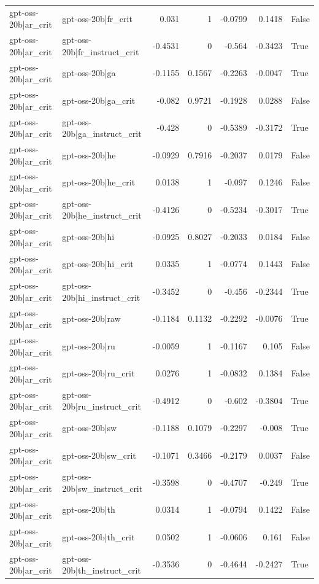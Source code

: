 \begin{table}
\begin{tabular}{l l r r r r l}
gpt-oss-20b|ar_crit & gpt-oss-20b|fr_crit & 0.031 & 1 & -0.0799 & 0.1418 & False \\
gpt-oss-20b|ar_crit & gpt-oss-20b|fr_instruct_crit & -0.4531 & 0 & -0.564 & -0.3423 & True \\
gpt-oss-20b|ar_crit & gpt-oss-20b|ga & -0.1155 & 0.1567 & -0.2263 & -0.0047 & True \\
gpt-oss-20b|ar_crit & gpt-oss-20b|ga_crit & -0.082 & 0.9721 & -0.1928 & 0.0288 & False \\
gpt-oss-20b|ar_crit & gpt-oss-20b|ga_instruct_crit & -0.428 & 0 & -0.5389 & -0.3172 & True \\
gpt-oss-20b|ar_crit & gpt-oss-20b|he & -0.0929 & 0.7916 & -0.2037 & 0.0179 & False \\
gpt-oss-20b|ar_crit & gpt-oss-20b|he_crit & 0.0138 & 1 & -0.097 & 0.1246 & False \\
gpt-oss-20b|ar_crit & gpt-oss-20b|he_instruct_crit & -0.4126 & 0 & -0.5234 & -0.3017 & True \\
gpt-oss-20b|ar_crit & gpt-oss-20b|hi & -0.0925 & 0.8027 & -0.2033 & 0.0184 & False \\
gpt-oss-20b|ar_crit & gpt-oss-20b|hi_crit & 0.0335 & 1 & -0.0774 & 0.1443 & False \\
gpt-oss-20b|ar_crit & gpt-oss-20b|hi_instruct_crit & -0.3452 & 0 & -0.456 & -0.2344 & True \\
gpt-oss-20b|ar_crit & gpt-oss-20b|raw & -0.1184 & 0.1132 & -0.2292 & -0.0076 & True \\
gpt-oss-20b|ar_crit & gpt-oss-20b|ru & -0.0059 & 1 & -0.1167 & 0.105 & False \\
gpt-oss-20b|ar_crit & gpt-oss-20b|ru_crit & 0.0276 & 1 & -0.0832 & 0.1384 & False \\
gpt-oss-20b|ar_crit & gpt-oss-20b|ru_instruct_crit & -0.4912 & 0 & -0.602 & -0.3804 & True \\
gpt-oss-20b|ar_crit & gpt-oss-20b|sw & -0.1188 & 0.1079 & -0.2297 & -0.008 & True \\
gpt-oss-20b|ar_crit & gpt-oss-20b|sw_crit & -0.1071 & 0.3466 & -0.2179 & 0.0037 & False \\
gpt-oss-20b|ar_crit & gpt-oss-20b|sw_instruct_crit & -0.3598 & 0 & -0.4707 & -0.249 & True \\
gpt-oss-20b|ar_crit & gpt-oss-20b|th & 0.0314 & 1 & -0.0794 & 0.1422 & False \\
gpt-oss-20b|ar_crit & gpt-oss-20b|th_crit & 0.0502 & 1 & -0.0606 & 0.161 & False \\
gpt-oss-20b|ar_crit & gpt-oss-20b|th_instruct_crit & -0.3536 & 0 & -0.4644 & -0.2427 & True \\

\end{tabular}
\end{table}

